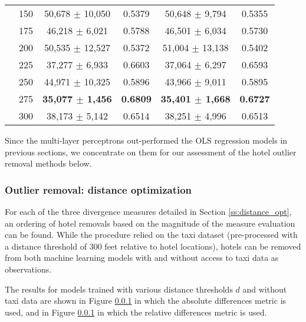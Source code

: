 \documentclass[useAMS, usenatbib]{biom}
\begin{document}
\begin{table}
\begin{center}
{\begin{tabular}{||c|c|c|c|c|c||}
 & 150 & 50,678 $\pm$ 10,050 & 0.5379 & 50,648 $\pm$ 9,794 & 0.5355 \\
 & 175 & 46,218 $\pm$ 6,021 & 0.5788 & 46,501 $\pm$ 6,034 & 0.5730 \\
 & 200 & 50,535 $\pm$ 12,527 & 0.5372 & 51,004 $\pm$ 13,138 & 0.5402 \\
 & 225 & 37,277 $\pm$ 6,933 & 0.6603 & 37,064 $\pm$ 6,297 & 0.6593 \\
 & 250 & 44,971 $\pm$ 10,325 & 0.5896 & 43,966 $\pm$ 9,011 & 0.5895 \\
 & 275 & \textbf{35,077 $\pm$ 1,456} & \textbf{0.6809} & \textbf{35,401 $\pm$ 1,668} & \textbf{0.6727} \\
 & 300 & 38,173 $\pm$ 5,142 & 0.6514 & 38,251 $\pm$ 4,996 & 0.6513 \\
 \hline
\end{tabular}
}
\end{center}
\end{table}

Since the multi-layer perceptrons out-performed the OLS regression models in previous sections, we concentrate on them for our assessment of the hotel outlier removal methods below.

\subsubsection{Outlier removal: distance optimization}

For each of the three divergence measures detailed in Section \ref{ss:distance_opt}, an ordering of hotel removals based on the magnitude of the measure evaluation can be found. While the procedure relied on the taxi dataset (pre-processed with a distance threshold of 300 feet relative to hotel locations), hotels can be removed from both machine learning models with and without access to taxi data as observations.

The results for models trained with various distance thresholds $d$ and without taxi data are shown in Figure \ref{} in which the absolute differences metric is used, and in Figure \ref{} in which the relative differences metric is used.
\end{document}
